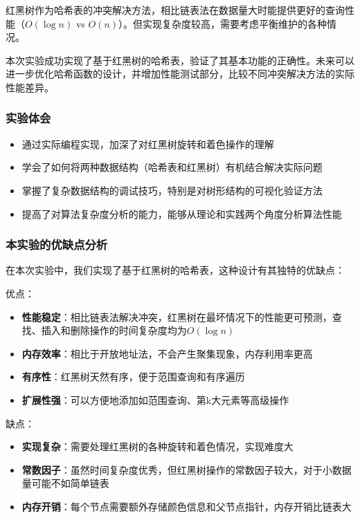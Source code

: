 \documentclass[12pt,a4paper]{article}
\begin{document}
红黑树作为哈希表的冲突解决方法，相比链表法在数据量大时能提供更好的查询性能（$O(\log n)$ vs $O(n)$）。但实现复杂度较高，需要考虑平衡维护的各种情况。

本次实验成功实现了基于红黑树的哈希表，验证了其基本功能的正确性。未来可以进一步优化哈希函数的设计，并增加性能测试部分，比较不同冲突解决方法的实际性能差异。

\subsubsection{实验体会}
\begin{itemize}
\item 通过实际编程实现，加深了对红黑树旋转和着色操作的理解
\item 学会了如何将两种数据结构（哈希表和红黑树）有机结合解决实际问题
\item 掌握了复杂数据结构的调试技巧，特别是对树形结构的可视化验证方法
\item 提高了对算法复杂度分析的能力，能够从理论和实践两个角度分析算法性能
\end{itemize}

\subsubsection{本实验的优缺点分析}
在本次实验中，我们实现了基于红黑树的哈希表，这种设计有其独特的优缺点：

优点：
\begin{itemize}
\item \textbf{性能稳定}：相比链表法解决冲突，红黑树在最坏情况下的性能更可预测，查找、插入和删除操作的时间复杂度均为$O(\log n)$
\item \textbf{内存效率}：相比于开放地址法，不会产生聚集现象，内存利用率更高
\item \textbf{有序性}：红黑树天然有序，便于范围查询和有序遍历
\item \textbf{扩展性强}：可以方便地添加如范围查询、第k大元素等高级操作
\end{itemize}

缺点：
\begin{itemize}
\item \textbf{实现复杂}：需要处理红黑树的各种旋转和着色情况，实现难度大
\item \textbf{常数因子}：虽然时间复杂度优秀，但红黑树操作的常数因子较大，对于小数据量可能不如简单链表
\item \textbf{内存开销}：每个节点需要额外存储颜色信息和父节点指针，内存开销比链表大
\end{itemize}
\end{document}
